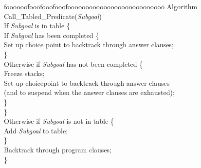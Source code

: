 
\vspace*{\itemsep}
\longline
\begin{sf}
\begin{tabbing}
  foooooo\=fooo\=fooo\=fooo\=fooooooooooooooooooooooooooo\=\kill
  \> Algorithm Call\_Tabled\_Predicate({\em Subgoal}) \\
  \> \> If {\em Subgoal} is in table \{ \\
  \> \> \> If {\em Subgoal} has been completed \{ \\
  \> \> \> \>  Set up choice point to backtrack through answer clauses; \\
  \> \> \> \} \\
  \> \> \> Otherwise if {\em Subgoal} has not been completed \{ \\
  \> \> \> \>  Freeze stacks; \\
  \> \> \> \>  Set up choicepoint to backtrack through answer clauses \\
  \> \> \> \>  (and to suspend when the answer clauses are exhausted); \\
  \> \> \> \} \\
  \> \> \} \\
  \> \> Otherwise if {\em Subgoal} is not in table \{ \\
  \> \> \> Add {\em Subgoal} to table; \\
  \> \> \} \\
  \> \> Backtrack through program clauses; \\
  \> \}
\end{tabbing}
\end{sf}
\longline
\vspace*{\itemsep}


